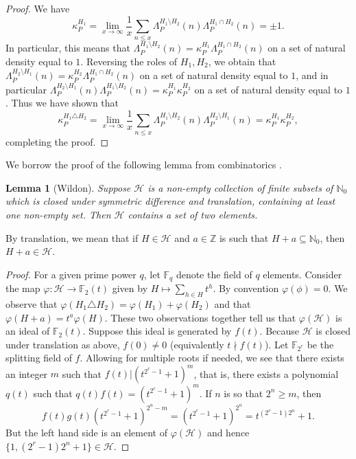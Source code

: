 \documentclass[12pt, a4paper]{amsart}
\newtheorem{lemma}{Lemma}
\theoremstyle{remark}
\theoremstyle{proof}
\numberwithin{equation}{section}
\numberwithin{assumption}{section}
\newcommand{\Z}{\mathbb{Z}}
\newcommand{\N}{\mathbb{N}}
\newcommand{\F}{\mathbb{F}}
\newcommand{\h}{\mathcal{H}}
\begin{document}
	\begin{proof}
	We have
		\[
		\kappa_{P}^{H_1} = \lim_{x\to\infty} \frac{1}{x} \sum_{n\leqslant x} \Lambda_{P}^{H_1\setminus H_2}(n) \Lambda_{P}^{H_1\cap H_2}(n)=\pm 1.
		\]
		In particular, this means that $\Lambda_P^{H_1\setminus H_2}(n) = \kappa_P^{H_1}\Lambda_P^{H_1\cap H_2}(n)$ on a set of natural density equal to $1$. Reversing the roles of $H_1,H_2$, we obtain that $\Lambda_P^{H_2\setminus H_1}(n) =  \kappa_P^{H_2}\Lambda_P^{H_1\cap H_2}(n)$ on a set of natural density equal to $1$, and in particular $\Lambda_P^{H_2\setminus H_1}(n)\Lambda_P^{H_1\setminus H_2}(n)=  \kappa_P^{H_1}\kappa_P^{H_2}$ on a set of natural density equal to $1$. Thus we have shown that
		\[
		\kappa_{P}^{H_1\triangle H_2} = \lim_{x\to\infty} \frac{1}{x} \sum_{n\leqslant x} \Lambda_{P}^{H_1\setminus H_2}(n) \Lambda_{P}^{H_2\setminus H_1}(n) =  \kappa_P^{H_1} \kappa_P^{H_2},
		\]
		completing the proof.
	\end{proof}
	
	We borrow the proof of the following lemma from combinatorics \cite{MarkWildon}.
	
	\begin{lemma}[Wildon]\label{Lemma "Second main theorem 2"}
		Suppose $\mathcal{H}$ is a non-empty collection of finite subsets of $\N_0$ which is closed under symmetric difference and translation, containing at least one non-empty set. Then $\h$ contains a set of two elements.
	\end{lemma}
	
	By translation, we mean that if $H\in \h$ and $a\in \Z$ is such that $H+a\subseteq \N_0$, then $H+a\in \h$.
	
	\begin{proof}
		For a given prime power $q$, let $\F_q$ denote the field of $q$ elements. Consider the map $\varphi : \h\to \F_2(t)$ given by $H\mapsto \sum_{h\in H} t^{h}$. By convention $\varphi(\phi)=0$. We observe that $\varphi(H_1\triangle H_2) = \varphi(H_1) + \varphi(H_2)$ and that $\varphi(H+a) = t^a \varphi(H)$. These two observations together tell us that $\varphi(\h)$ is an ideal of $\F_2(t)$. Suppose this ideal is generated by $f(t)$. Because $\h$ is closed under translation as above, $f(0)\neq 0$ (equivalently $t\nmid f(t)$). Let $\F_{2^r}$ be the splitting field of $f$. Allowing for multiple roots if needed, we see that there exists an integer $m$ such that $f(t) | (t^{2^{r}-1}+1)^m$, that is, there exists a polynomial $q(t)$ such that $q(t)f(t) = (t^{2^{r}-1}+1)^m$. If $n$ is so that $2^n\geqslant m$, then
		\[
		f(t) g(t)(t^{2^{r}-1}+1)^{2^n-m} = (t^{2^{r}-1}+1)^{2^n} = t^{(2^{r}-1)2^n}+1.
		\]
		But the left hand side is an element of $\varphi(\h)$ and hence $\{1, (2^{r}-1)2^n+1\}\in \h$.
	\end{proof}
	
\end{document}
